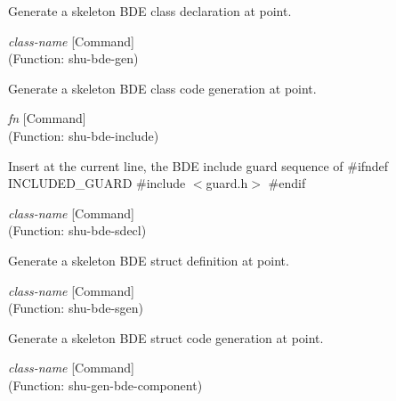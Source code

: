 \begin{doc-string}
Generate a skeleton BDE class declaration at point.
\end{doc-string}

\vspace{1em}
\noindent
{}
\usebox{\funcname}\emph{class-name}
 \hfill [Command]\\%
 (Function: shu-bde-gen)

\begin{doc-string}
Generate a skeleton BDE class code generation at point.
\end{doc-string}

\vspace{1em}
\noindent
{}
\usebox{\funcname}\emph{fn}
 \hfill [Command]\\%
 (Function: shu-bde-include)

\begin{doc-string}
Insert at the current line, the BDE include guard sequence of
\#ifndef INCLUDED\_GUARD
\#include $<$guard.h$>$
\#endif
\end{doc-string}

\vspace{1em}
\noindent
{}
\usebox{\funcname}\emph{class-name}
 \hfill [Command]\\%
 (Function: shu-bde-sdecl)

\begin{doc-string}
Generate a skeleton BDE struct definition at point.
\end{doc-string}

\vspace{1em}
\noindent
{}
\usebox{\funcname}\emph{class-name}
 \hfill [Command]\\%
 (Function: shu-bde-sgen)

\begin{doc-string}
Generate a skeleton BDE struct code generation at point.
\end{doc-string}

\vspace{1em}
\noindent
{}
\usebox{\funcname}\emph{class-name}
 \hfill [Command]\\%
 (Function: shu-gen-bde-component)

